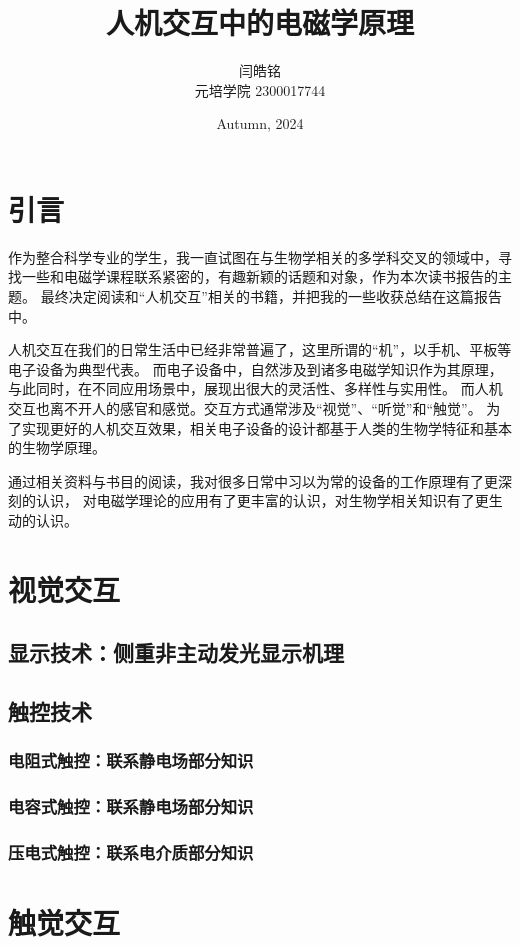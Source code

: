 \documentclass[UTF-8]{ctexart}
\title{人机交互中的电磁学原理}
\author{闫皓铭 \\ 元培学院 2300017744}
\date{Autumn, 2024}
\begin{document}
\maketitle

\section{引言}
作为整合科学专业的学生，我一直试图在与生物学相关的多学科交叉的领域中，寻找一些和电磁学课程联系紧密的，有趣新颖的话题和对象，作为本次读书报告的主题。
最终决定阅读和“人机交互”相关的书籍，并把我的一些收获总结在这篇报告中。

人机交互在我们的日常生活中已经非常普遍了，这里所谓的“机”，以手机、平板等电子设备为典型代表。
而电子设备中，自然涉及到诸多电磁学知识作为其原理，与此同时，在不同应用场景中，展现出很大的灵活性、多样性与实用性。
而人机交互也离不开人的感官和感觉。交互方式通常涉及“视觉”、“听觉”和“触觉”。
为了实现更好的人机交互效果，相关电子设备的设计都基于人类的生物学特征和基本的生物学原理。

通过相关资料与书目的阅读，我对很多日常中习以为常的设备的工作原理有了更深刻的认识，
对电磁学理论的应用有了更丰富的认识，对生物学相关知识有了更生动的认识。
\section{视觉交互} 
\subsection{显示技术：侧重非主动发光显示机理}
\subsection{触控技术}
\subsubsection{电阻式触控：联系静电场部分知识}
\subsubsection{电容式触控：联系静电场部分知识}
\subsubsection{压电式触控：联系电介质部分知识}
\section{触觉交互}
\end{document}
